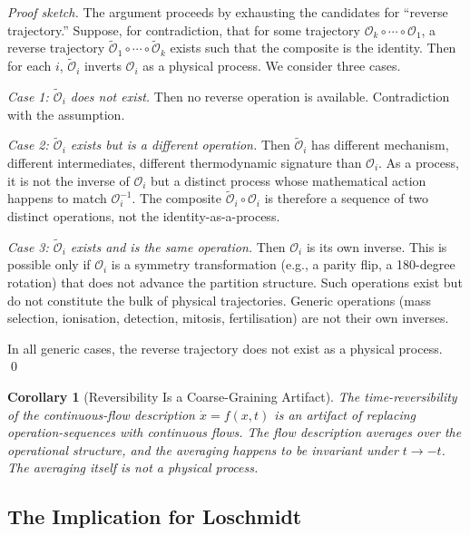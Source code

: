 \documentclass[twocolumn,10pt,a4paper]{article}
\newtheorem{corollary}[theorem]{Corollary}
\theoremstyle{definition}
\theoremstyle{remark}
\newcommand{\Operation}{\mathcal{O}}
\begin{document}
\begin{proof}[Proof sketch]
The argument proceeds by exhausting the candidates for ``reverse trajectory.'' Suppose, for contradiction, that for some trajectory $\Operation_k \circ \cdots \circ \Operation_1$, a reverse trajectory $\widetilde{\Operation}_1 \circ \cdots \circ \widetilde{\Operation}_k$ exists such that the composite is the identity. Then for each $i$, $\widetilde{\Operation}_i$ inverts $\Operation_i$ as a physical process. We consider three cases.

\emph{Case 1: $\widetilde{\Operation}_i$ does not exist.} Then no reverse operation is available. Contradiction with the assumption.

\emph{Case 2: $\widetilde{\Operation}_i$ exists but is a different operation.} Then $\widetilde{\Operation}_i$ has different mechanism, different intermediates, different thermodynamic signature than $\Operation_i$. As a process, it is not the inverse of $\Operation_i$ but a distinct process whose mathematical action happens to match $\Operation_i^{-1}$. The composite $\widetilde{\Operation}_i \circ \Operation_i$ is therefore a sequence of two distinct operations, not the identity-as-a-process.

\emph{Case 3: $\widetilde{\Operation}_i$ exists and is the same operation.} Then $\Operation_i$ is its own inverse. This is possible only if $\Operation_i$ is a symmetry transformation (e.g., a parity flip, a 180-degree rotation) that does not advance the partition structure. Such operations exist but do not constitute the bulk of physical trajectories. Generic operations (mass selection, ionisation, detection, mitosis, fertilisation) are not their own inverses.

In all generic cases, the reverse trajectory does not exist as a physical process. \qed
\end{proof}

\begin{corollary}[Reversibility Is a Coarse-Graining Artifact]
\label{cor:coarse-graining}
The time-reversibility of the continuous-flow description $\dot{x} = f(x,t)$ is an artifact of replacing operation-sequences with continuous flows. The flow description averages over the operational structure, and the averaging happens to be invariant under $t \to -t$. The averaging itself is not a physical process.
\end{corollary}

\subsection{The Implication for Loschmidt}
\end{document}

